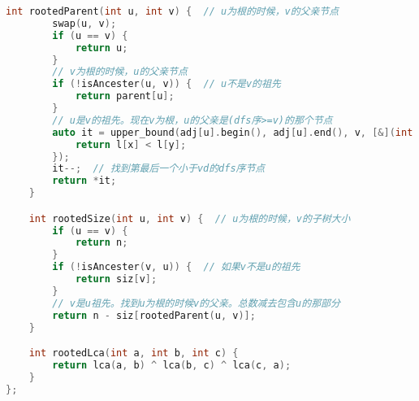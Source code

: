 \begin{lstlisting}[language=C++]
    int rootedParent(int u, int v) {  // u为根的时候，v的父亲节点
        swap(u, v);
        if (u == v) {
            return u;
        }
        // v为根的时候，u的父亲节点
        if (!isAncester(u, v)) {  // u不是v的祖先
            return parent[u];
        }
        // u是v的祖先。现在v为根，u的父亲是(dfs序>=v)的那个节点
        auto it = upper_bound(adj[u].begin(), adj[u].end(), v, [&](int x, int y) {
            return l[x] < l[y];
        });
        it--;  // 找到第最后一个小于vd的dfs序节点
        return *it;
    }

    int rootedSize(int u, int v) {  // u为根的时候，v的子树大小
        if (u == v) {
            return n;
        }
        if (!isAncester(v, u)) {  // 如果v不是u的祖先
            return siz[v];
        }
        // v是u祖先。找到u为根的时候v的父亲。总数减去包含u的那部分
        return n - siz[rootedParent(u, v)];
    }

    int rootedLca(int a, int b, int c) {
        return lca(a, b) ^ lca(b, c) ^ lca(c, a);
    }
};
\end{lstlisting}
